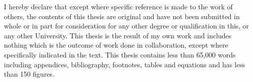 
\begin{declaration}

I hereby declare that except where specific reference is made to the work of others, the contents of this thesis are original and have not been submitted in whole or in part for consideration for any other degree or qualification in this, or any other University. This thesis is the result of my own work and includes nothing which is the outcome of work done in collaboration, except where specifically indicated in the text. This thesis contains less than 65,000 words including appendices, bibliography, footnotes, tables and equations and has less than 150 figures.


\end{declaration}

